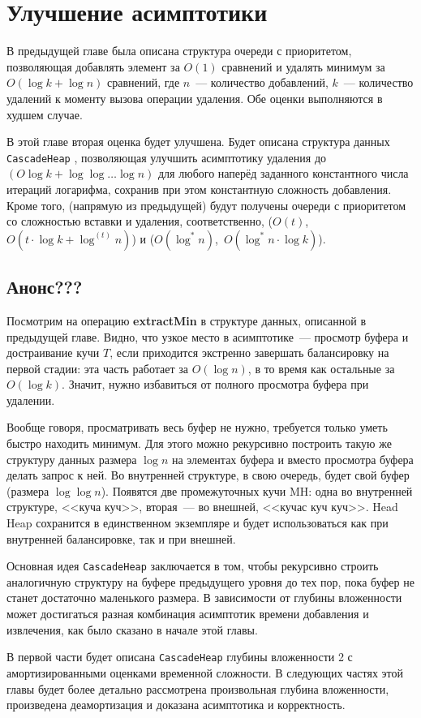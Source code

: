 \chapter{Улучшение асимптотики}

\newcommand{\CH}{\texttt{CascadeHeap} }

В предыдущей главе была описана структура очереди с приоритетом, позволяющая
добавлять элемент за $O(1)$ сравнений и удалять минимум за $O(\log k + \log n)$
сравнений, где $n$~--- количество добавлений, $k$~--- количество удалений
к моменту вызова операции удаления. Обе оценки выполняются в худшем случае.

В этой главе вторая оценка будет улучшена.  Будет описана структура данных \CH,
позволяющая улучшить асимптотику удаления до $(O\log k + \log \log \dots \log n)$
для любого наперёд заданного константного числа итераций логарифма, сохранив при
этом константную сложность добавления. Кроме того, (напрямую из предыдущей)
будут получены очереди с приоритетом со сложностью вставки и удаления,
соответственно, ($O(t)$,~$O(t \cdot \log k + \log ^{(t)} n)$) и
($O(\log^* n)$,~$O(\log^* n \cdot \log k)$).

\section*{Анонс???}

Посмотрим на операцию \textbf{extractMin} в структуре данных, описанной в предыдущей
главе. Видно, что узкое место в асимптотике~--- просмотр буфера и достраивание
кучи $T$, если приходится экстренно завершать балансировку на первой стадии:
эта часть работает за $O(\log n)$, в то время как остальные за $O(\log k)$.
Значит, нужно избавиться от полного просмотра буфера при удалении.

Вообще говоря, просматривать весь буфер не нужно, требуется только уметь быстро
находить минимум. Для этого можно рекурсивно построить такую же структуру данных
размера $\log n$ на элементах буфера и вместо просмотра буфера делать запрос к ней.
Во внутренней структуре, в свою очередь, будет свой буфер (размера $\log \log n$).
Появятся две промежуточных кучи MH: одна во внутренней структуре, <<куча куч>>,
вторая~--- во внешней, <<кучас куч куч>>. Head Heap сохранится в единственном
экземпляре и будет использоваться как при внутренней балансировке, так и при внешней.

Основная идея \CH заключается в том, чтобы рекурсивно строить аналогичную
структуру на буфере предыдущего уровня до тех пор, пока буфер не станет достаточно
маленького размера. В зависимости от глубины вложенности может достигаться
разная комбинация асимптотик времени добавления и извлечения, как было сказано
в начале этой главы.

В первой части будет описана \CH глубины вложенности 2 с амортизированными оценками
временной сложности. В следующих частях этой главы будет более детально рассмотрена
произвольная глубина вложенности, произведена деамортизация и доказана асимптотика
и корректность.
